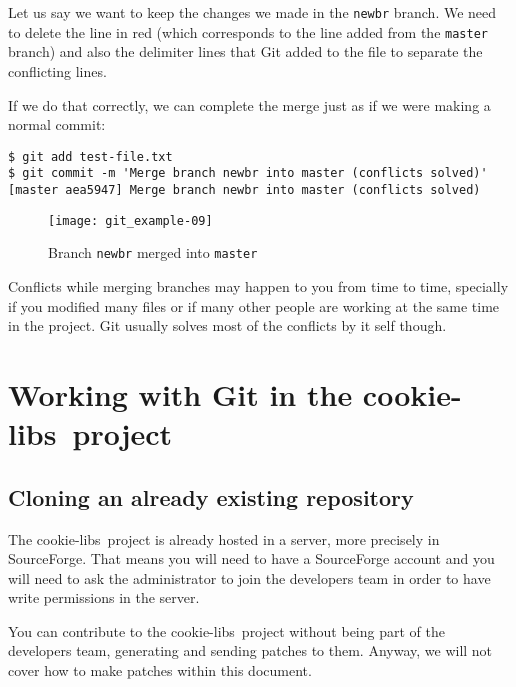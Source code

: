 \documentclass[a4paper,10pt]{article}
\newcommand{\projectname}{cookie-libs}
\newenvironment{terminal}
  {
    \vspace{+10pt}
    \begin{center}
    \begin{minipage}{0.95\textwidth}
    \begin{framed}
  }
  {
    \end{framed}
    \end{minipage}
    \end{center}
    \vspace{+10pt}
  }
\begin{document}
Let us say we want to keep the changes we made in the \texttt{newbr}
branch. We need to delete the line in red (which corresponds to the
line added from the \texttt{master} branch) and also the delimiter
lines that Git added to the file to separate the conflicting lines.

If we do that correctly, we can complete the merge just as if we were
making a normal commit:

\begin{terminal}
\begin{verbatim}
$ git add test-file.txt
$ git commit -m 'Merge branch newbr into master (conflicts solved)'
[master aea5947] Merge branch newbr into master (conflicts solved)
\end{verbatim}
\end{terminal}

\begin{figure}
  \begin{center}
    \texttt{[image: git\_example-09]}
  \end{center}
  \caption{Branch \texttt{newbr} merged into \texttt{master}}
\end{figure}

\begin{tip}
Conflicts while merging branches may happen to you from time to time,
specially if you modified many files or if many other
people are working at the same time in the project. Git usually solves
most of the conflicts by it self though.
\end{tip}

\section{Working with Git in the \projectname\ project}

\subsection{Cloning an already existing repository}

The \projectname\ project is already hosted in a server, more precisely
in SourceForge. That means you will need to have a SourceForge account
and you will need to ask the administrator to join the developers team
in order to have write permissions in the server.

\begin{tip}
You can contribute to the \projectname\ project without being part of
the developers team, generating and sending patches to them. Anyway,
we will not cover how to make patches within this document.
\end{tip}
\end{document}
